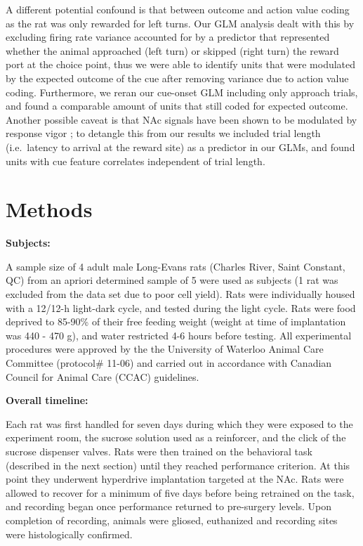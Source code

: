 \documentclass[11pt]{article}
\let\cite=\citep
\begin{document}
A different potential confound is that between outcome and action
value coding as the rat was only rewarded for left turns. Our GLM
analysis dealt with this by excluding firing rate variance accounted
for by a predictor that represented whether the animal approached
(left turn) or skipped (right turn) the reward port at the choice
point, thus we were able to identify units that were modulated by the
expected outcome of the cue after removing variance due to action
value coding. Furthermore, we reran our cue-onset GLM including only
approach trials, and found a comparable amount of units that still
coded for expected outcome. Another possible caveat is that NAc
signals have been shown to be modulated by response vigor
\cite{McGinty2013}; to detangle this from our results we included
trial length (i.e.\ latency to arrival at the reward site) as a
predictor in our GLMs, and found units with cue feature correlates
independent of trial length.

\section*{Methods}

{\bf Subjects:}

A sample size of 4 adult male Long-Evans rats (Charles River, Saint Constant, QC) from an apriori determined sample of 5 
were used as subjects (1 rat was excluded from the data set due to poor cell yield). Rats were individually housed with a 12/12-h
light-dark cycle, and tested during the light cycle. Rats were food
deprived to 85-90\% of their free feeding weight (weight at time of
implantation was 440 - 470 g), and water restricted 4-6 hours before
testing. All experimental procedures were approved by the the
University of Waterloo Animal Care Committee (protocol\# 11-06) and
carried out in accordance with Canadian Council for Animal Care (CCAC)
guidelines.

{\bf Overall timeline:}

Each rat was first handled for seven days during which they were
exposed to the experiment room, the sucrose solution used as a
reinforcer, and the click of the sucrose dispenser valves. Rats were
then trained on the behavioral task (described in the next section)
until they reached performance criterion. At this point they
underwent hyperdrive implantation targeted at the NAc. Rats were
allowed to recover for a minimum of five days before being retrained
on the task, and recording began once performance returned to
pre-surgery levels. Upon completion of recording, animals were gliosed,
euthanized and recording sites were histologically confirmed.
\end{document}
